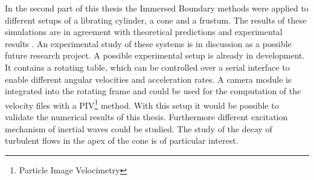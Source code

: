 In the second part of this thesis the Immersed Boundary methods were applied to different setups of a librating cylinder,  a cone and a frustum.
The results of these simulations are in agreement with theoretical
predictions \citep{Greenspan1969} and experimental results \cite{Beardsley1970}.
An experimental study of these systems is in discussion as a possible future research project.
A possible experimental setup is already in development.
It contains a rotating table, which can be controlled over a serial interface to enable different angular velocities and acceleration rates.
A camera module is integrated into the rotating frame and could be used for the computation
of the velocity files with a PIV\footnote{Particle Image Velocimetry}
method.
With this setup it would be possible to validate the numerical results of this thesis.
Furthermore different excitation mechanism of inertial waves could be studied.
The study of the decay of turbulent flows in the apex of the cone is of particular interest.



